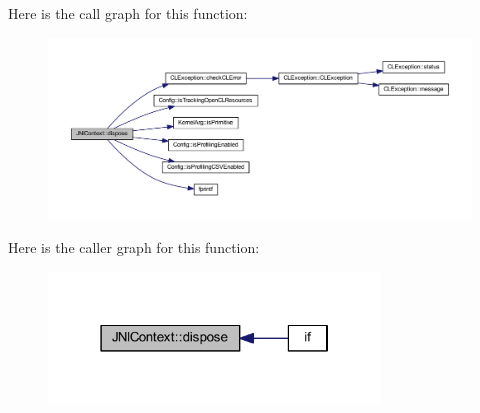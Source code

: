 Here is the call graph for this function\-:
\nopagebreak
\begin{figure}[H]
\begin{center}
\leavevmode
\includegraphics[width=350pt]{class_j_n_i_context_ae0906906c3fe4d7b5c468724bf338903_cgraph}
\end{center}
\end{figure}




Here is the caller graph for this function\-:
\nopagebreak
\begin{figure}[H]
\begin{center}
\leavevmode
\includegraphics[width=250pt]{class_j_n_i_context_ae0906906c3fe4d7b5c468724bf338903_icgraph}
\end{center}
\end{figure}



